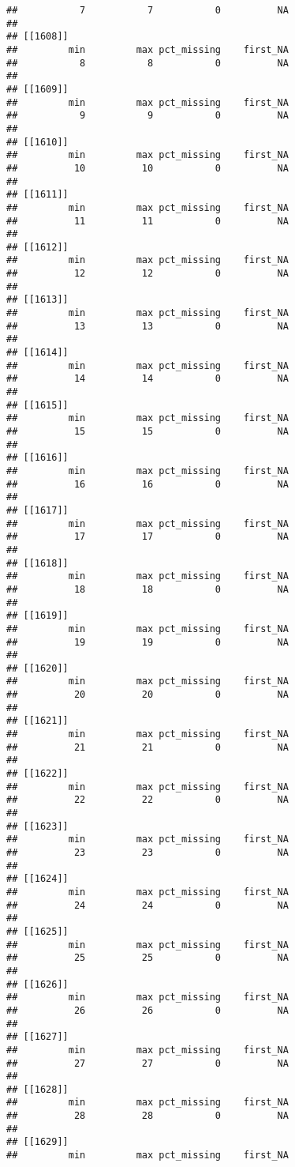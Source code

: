 \documentclass[
]{article}
\begin{document}
\begin{verbatim}
##           7           7           0          NA 
## 
## [[1608]]
##         min         max pct_missing    first_NA 
##           8           8           0          NA 
## 
## [[1609]]
##         min         max pct_missing    first_NA 
##           9           9           0          NA 
## 
## [[1610]]
##         min         max pct_missing    first_NA 
##          10          10           0          NA 
## 
## [[1611]]
##         min         max pct_missing    first_NA 
##          11          11           0          NA 
## 
## [[1612]]
##         min         max pct_missing    first_NA 
##          12          12           0          NA 
## 
## [[1613]]
##         min         max pct_missing    first_NA 
##          13          13           0          NA 
## 
## [[1614]]
##         min         max pct_missing    first_NA 
##          14          14           0          NA 
## 
## [[1615]]
##         min         max pct_missing    first_NA 
##          15          15           0          NA 
## 
## [[1616]]
##         min         max pct_missing    first_NA 
##          16          16           0          NA 
## 
## [[1617]]
##         min         max pct_missing    first_NA 
##          17          17           0          NA 
## 
## [[1618]]
##         min         max pct_missing    first_NA 
##          18          18           0          NA 
## 
## [[1619]]
##         min         max pct_missing    first_NA 
##          19          19           0          NA 
## 
## [[1620]]
##         min         max pct_missing    first_NA 
##          20          20           0          NA 
## 
## [[1621]]
##         min         max pct_missing    first_NA 
##          21          21           0          NA 
## 
## [[1622]]
##         min         max pct_missing    first_NA 
##          22          22           0          NA 
## 
## [[1623]]
##         min         max pct_missing    first_NA 
##          23          23           0          NA 
## 
## [[1624]]
##         min         max pct_missing    first_NA 
##          24          24           0          NA 
## 
## [[1625]]
##         min         max pct_missing    first_NA 
##          25          25           0          NA 
## 
## [[1626]]
##         min         max pct_missing    first_NA 
##          26          26           0          NA 
## 
## [[1627]]
##         min         max pct_missing    first_NA 
##          27          27           0          NA 
## 
## [[1628]]
##         min         max pct_missing    first_NA 
##          28          28           0          NA 
## 
## [[1629]]
##         min         max pct_missing    first_NA 

\end{verbatim}
\end{document}
